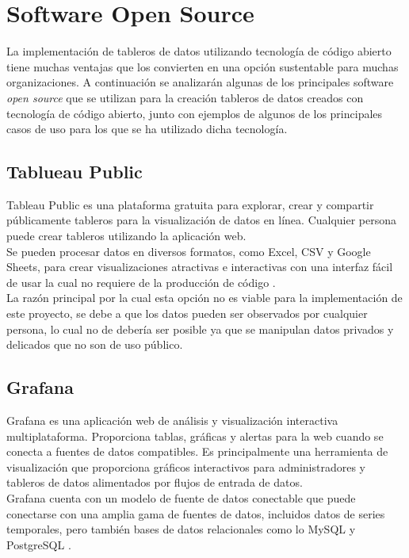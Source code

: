\section{Software Open Source}
La implementación de tableros de datos utilizando tecnología de código abierto tiene muchas ventajas que los convierten en una opción sustentable para muchas organizaciones. A continuación se analizarán algunas de los principales software \textit{open source} que se utilizan para la creación tableros de datos creados con tecnología de código abierto, junto con ejemplos de algunos de los principales casos de uso para los que se ha utilizado dicha tecnología.

\subsection{Tablueau Public}
Tableau Public es una plataforma gratuita para explorar, crear y compartir públicamente tableros para la visualización de datos en línea. Cualquier persona puede crear tableros utilizando la aplicación web.\\
Se pueden procesar datos en diversos formatos, como Excel, CSV y Google Sheets, para crear visualizaciones atractivas e interactivas con una interfaz fácil de usar la cual no requiere de la producción de código \cite{tableau_public_about}.\\

La razón principal por la cual esta opción no es viable para la implementación de este proyecto, se debe a que los datos pueden ser observados por cualquier persona, lo cual no de debería ser posible ya que se manipulan datos privados y delicados que no son de uso público.

\subsection{Grafana}
Grafana es una aplicación web de análisis y visualización interactiva multiplataforma. Proporciona tablas, gráficas y alertas para la web cuando se conecta a fuentes de datos compatibles. Es principalmente una herramienta de visualización que proporciona gráficos interactivos para administradores y tableros de datos alimentados por flujos de entrada de datos.\\
Grafana cuenta con un modelo de fuente de datos conectable que puede conectarse con una amplia gama de fuentes de datos, incluidos datos de series temporales, pero también bases de datos relacionales como lo MySQL y PostgreSQL \cite{mccollam2022getting}.\\

